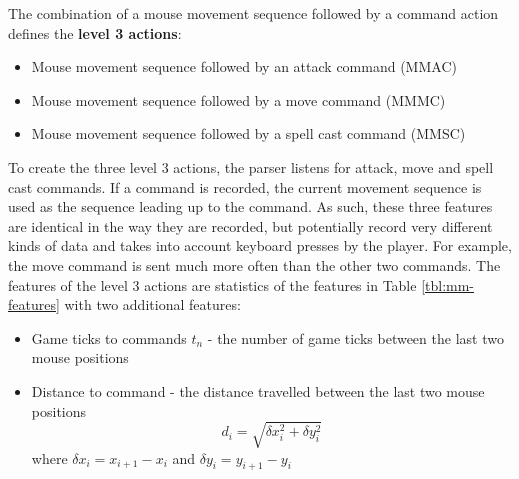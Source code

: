 \documentclass[Report.tex]{subfiles}
\begin{document}
The combination of a mouse movement sequence followed by a command action defines the \textbf{level 3 actions}:
\begin{itemize}
\item Mouse movement sequence followed by an attack command (MMAC)
\item Mouse movement sequence followed by a move command (MMMC)
\item Mouse movement sequence followed by a spell cast command (MMSC)
\end{itemize}
To create the three level 3 actions, the parser listens for attack, move and spell cast commands. If a command is recorded, the current movement sequence is used as the sequence leading up to the command. As such, these three features are identical in the way they are recorded, but potentially record very different kinds of data and takes into account keyboard presses by the player. For example, the move command is sent much more often than the other two commands. The features of the level 3 actions are statistics of the features in Table \ref{tbl:mm-features} with two additional features:
\begin{itemize}
\item Game ticks to commands $t_n$ - the number of game ticks between the last two mouse positions
\item Distance to command - the distance travelled between the last two mouse positions
\begin{equation}
d_i = \sqrt{\delta x_{i}^2 + \delta y_{i}^2}
\end{equation} 
where $\delta x_i = x_{i+1} - x_i$ and $\delta y_i = y_{i+1} - y_i$
\end{itemize}
\end{document}
